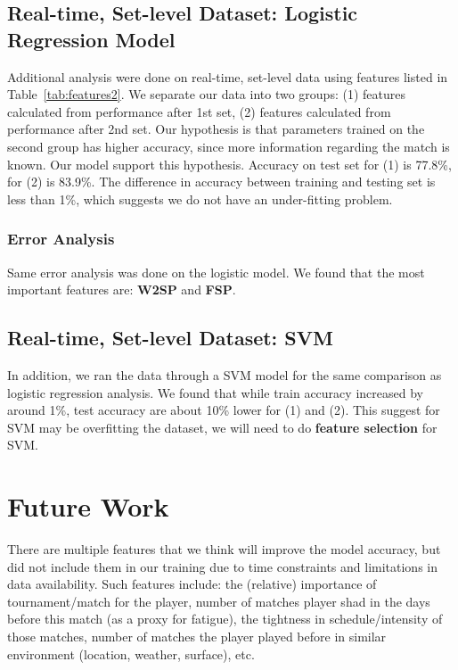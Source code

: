 \documentclass[paper=a4, fontsize=10pt]{scrartcl} %
\numberwithin{equation}{section} %
\numberwithin{figure}{section} %
\numberwithin{table}{section} %
\begin{document}
\subsection{Real-time, Set-level Dataset: Logistic Regression Model}
Additional analysis were done on real-time, set-level data using features listed in Table~\ref{tab:features2}. We separate our data into two groups: (1) features calculated from performance after 1st set, (2) features calculated from performance after 2nd set.  Our hypothesis is that parameters trained on the second group has higher accuracy, since more information regarding the match is known.  Our model support this hypothesis.  Accuracy on test set for (1) is 77.8\%, for (2) is 83.9\%.  The difference in accuracy between training and testing set is less than 1\%, which suggests we do not have an under-fitting problem.
\subsubsection{Error Analysis}
Same error analysis was done on the logistic model.  We found that the most important features are: \textbf{W2SP} and \textbf{FSP}.
\subsection{Real-time, Set-level Dataset:  SVM}
In addition, we ran the data through a SVM model for the same comparison as logistic regression analysis.  We found that while train accuracy increased by around 1\%, test accuracy are about 10\%  lower for (1) and (2).  This suggest for SVM may be overfitting the dataset, we will need to do \textbf{feature selection} for SVM.

\section{Future Work}
There are multiple features that we think will improve the model accuracy, but did not include them in our training due to time constraints and limitations in data availability. Such features include: the (relative) importance of tournament/match for the player, number of matches player shad in the days before this match (as a proxy for fatigue), the tightness in schedule/intensity of those matches, number of matches the player played before in similar environment (location, weather, surface), etc.
\end{document}
